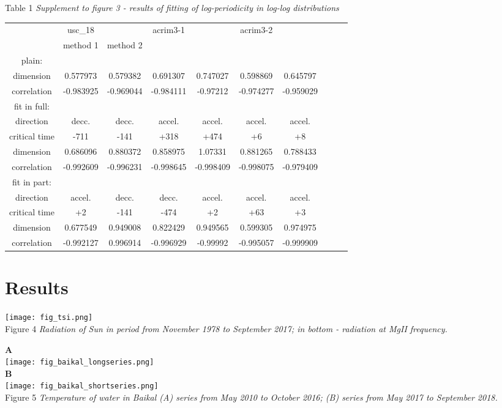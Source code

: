 \documentclass[a4paper]{article}
\begin{document}
Table 1 \textit{Supplement to figure 3 - results of fitting of log-periodicity in log-log distributions}
\vskip 12pt
\begin{tabular}{cccccccccc}
\hline
             & usc\_18        &           & acrim3-1  &           & acrim3-2  &           \\
             & method 1       & method 2  &           &           &           &           \\
\hline
plain: \\
dimension     & 0.577973  & 0.579382  & 0.691307  & 0.747027  & 0.598869  & 0.645797  \\
correlation   & -0.983925 & -0.969044 & -0.984111 & -0.97212  & -0.974277 & -0.959029 \\
\hline
fit in full: \\ 
direction     & decc.     & decc.     & accel.    & accel.    & accel.    & accel.    \\
critical time & -711      & -141      & +318      & +474      & +6        & +8        \\
dimension     & 0.686096  & 0.880372  & 0.858975  & 1.07331   & 0.881265  & 0.788433  \\
correlation   & -0.992609 & -0.996231 & -0.998645 & -0.998409 & -0.998075 & -0.979409 \\
\hline
fit in part: \\
direction     & accel.    & decc.     & decc.     & accel.    & accel.    & accel.    \\
critical time & +2        & -141      & -474      & +2        & +63       & +3        \\
dimension     & 0.677549  & 0.949008  & 0.822429  & 0.949565  & 0.599305  & 0.974975  \\
correlation   & -0.992127 & 0.996914  & -0.996929 & -0.99992  & -0.995057 & -0.999909 \\
\hline
\end{tabular}

\newpage
\section*{Results}

\texttt{[image: fig\_tsi.png]}\\
\vskip 12pt
Figure 4 \textit{Radiation of Sun in period from November 1978 to September 2017; in bottom - radiation at MgII frequency. }

\newpage
{\large{\textbf{A}}}\\
\texttt{[image: fig\_baikal\_longseries.png]}\\
\vskip 12pt
{\large{\textbf{B}}}\\
\texttt{[image: fig\_baikal\_shortseries.png]}\\
\vskip 12pt
Figure 5 \textit{Temperature of water in Baikal (A) series from May 2010 to October 2016; (B) series from May 2017 to September 2018. }
\end{document}
